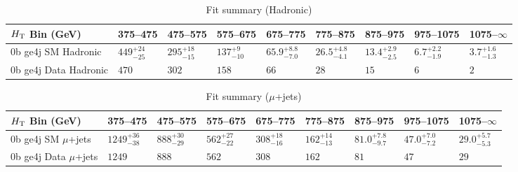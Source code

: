 \documentclass[8pt]{article}
\def\scalht{\mbox{$H_{\rm{T}}$}\xspace}
\newcommand\T{\rule{0pt}{2.6ex}}
\begin{document}
\begin{table}[ht!]
\caption{Fit summary (Hadronic)}
\label{tab:ensemble-summary}
\centering
\begin{tabular}{ lllllllll }

\hline
\scalht Bin (GeV)       & 375--475                       & 475--575                       & 575--675                       & 675--775                       & 775--875                       & 875--975                       & 975--1075                      & 1075--$\infty$                 \\ [1.000000ex]
\hline
0b ge4j SM Hadronic\T   & $449^{+24}_{-25}$              & $295^{+18}_{-15}$              & $137^{+9}_{-10}$               & $65.9^{+8.8}_{-7.0}$           & $26.5^{+4.8}_{-4.1}$           & $13.4^{+2.9}_{-2.5}$           & $6.7^{+2.2}_{-1.9}$            & $3.7^{+1.6}_{-1.3}$            \\ 
0b ge4j Data Hadronic\T & $470$                          & $302$                          & $158$                          & $66$                           & $28$                           & $15$                           & $6$                            & $2$                            \\ 
\hline

\end{tabular}
\end{table}
\begin{table}[ht!]
\caption{Fit summary ($\mu$+jets)}
\label{tab:ensemble-summary}
\centering
\begin{tabular}{ lllllllll }

\hline
\scalht Bin (GeV)       & 375--475                       & 475--575                       & 575--675                       & 675--775                       & 775--875                       & 875--975                       & 975--1075                      & 1075--$\infty$                 \\ [1.000000ex]
\hline
0b ge4j SM $\mu$+jets\T & $1249^{+36}_{-38}$             & $888^{+30}_{-29}$              & $562^{+27}_{-22}$              & $308^{+18}_{-16}$              & $162^{+14}_{-13}$              & $81.0^{+7.8}_{-9.7}$           & $47.0^{+7.0}_{-7.2}$           & $29.0^{+5.7}_{-5.3}$           \\ 
0b ge4j Data $\mu$+jets\T & $1249$                         & $888$                          & $562$                          & $308$                          & $162$                          & $81$                           & $47$                           & $29$                           \\ 
\hline

\end{tabular}
\end{table}
\end{document}
